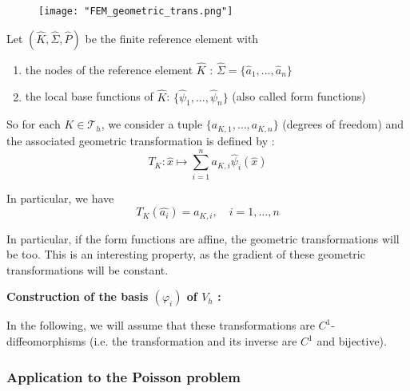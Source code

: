 \begin{figure}[H]
	\centering
	\texttt{[image: "FEM\_geometric\_trans.png"]}
	\label{trans_geo}
\end{figure}

Let $(\hat{K},\hat{\Sigma},\hat{P})$ be the finite reference element with 
\begin{enumerate}[label=\textbullet]
	\item the nodes of the reference element $\hat{K}$ : $\hat{\Sigma}=\{\hat{a}_1,\dots,\hat{a}_n\}$
	\item the local base functions of $\hat{K}$: $\{\hat{\psi}_1,\dots,\hat{\psi}_n\}$ (also called form functions)
\end{enumerate}

So for each $K\in\mathcal{T}_h$, we consider a tuple $\{a_{K,1},\dots,a_{K,n}\}$ (degrees of freedom) and the associated geometric transformation is defined by :
\begin{equation*}
	T_K : \hat{x}\mapsto\sum_{i=1}^{n}a_{K,i}\hat{\psi}_i(\hat{x})
\end{equation*}

In particular, we have
\begin{equation*}
	T_K(\hat{a_i})=a_{K,i}, \quad i=1,\dots,n
\end{equation*}

\begin{Rem}
	In particular, if the form functions are affine, the geometric transformations will be too. This is an interesting property, as the gradient of these geometric transformations will be constant.
\end{Rem}

\textbf{Construction of the basis $(\varphi_i)$ of $V_h$ :}


\begin{Rem}
	In the following, we will assume that these transformations are $C^1$-diffeomorphisms (i.e. the transformation and its inverse are $C^1$ and bijective).
\end{Rem}

\subsubsection{Application to the Poisson problem}


